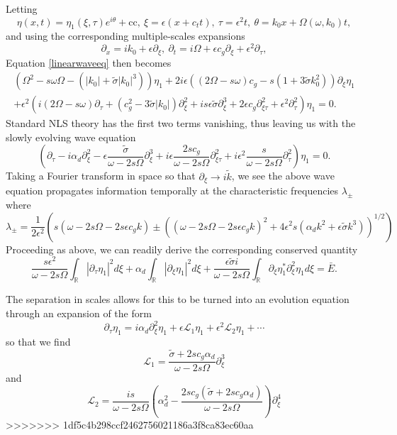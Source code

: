 \documentclass[a4paper,11pt]{article}
\newcommand{\pd}{\partial}
\begin{document}
Letting
\[
\eta(x,t) = \eta_{1}(\xi,\tau)e^{i\theta}+\mbox{cc}, ~ \xi = \epsilon(x+c_{t}t), ~ \tau = \epsilon^{2}t, ~ \theta = k_{0}x + \Omega(\omega,k_{0})t,
\]
and using the corresponding multiple-scales expansions
\[
\pd_{x} = ik_{0} + \epsilon \pd_{\xi}, ~ \pd_{t} = i\Omega + \epsilon c_{g}\pd_{\xi} + \epsilon^{2}\pd_{\tau}, 
\]
Equation \eqref{linearwaveeq} then becomes 
\begin{multline*}
\left(\Omega^{2} -s\omega\Omega - (|k_{0}|+\tilde{\sigma}|k_{0}|^{3})\right)\eta_{1} + 2i\epsilon\left((2\Omega-s\omega)c_{g} - s(1+3\tilde{\sigma}k_{0}^{2}) \right)\pd_{\xi}\eta_{1}\\
+ \epsilon^{2}\left(i(2\Omega-s\omega)\pd_{\tau}+(c^{2}_{g}-3\tilde{\sigma}|k_{0}|)\pd^{2}_{\xi} + is\epsilon\tilde{\sigma}\pd_{\xi}^{3} + 2\epsilon c_{g}\pd^{2}_{\xi \tau} + \epsilon^{2}\pd^{2}_{\tau}\right)\eta_{1} = 0.
\end{multline*}
Standard NLS theory has the first two terms vanishing, thus leaving us with the slowly evolving wave equation 
\[
\left(\pd_{\tau}-i\alpha_{d}\pd^{2}_{\xi} - \epsilon\frac{\tilde{\sigma}}{\omega-2s\Omega}\pd_{\xi}^{3} + i\epsilon \frac{2sc_{g}}{\omega-2s\Omega}\pd^{2}_{\xi \tau} + i\epsilon^{2}\frac{s}{\omega-2s\Omega}\pd^{2}_{\tau}\right)\eta_{1} = 0.
\]
Taking a Fourier transform in space so that $\pd_{\xi}\rightarrow i\tilde{k}$, we see the above wave equation propagates information temporally at the characteristic frequencies $\lambda_{\pm}$ where
\[
\lambda_{\pm} = \frac{1}{2\epsilon^{2}}\left(s(\omega-2s\Omega-2s\epsilon c_{g}k) \pm \left((\omega-2s\Omega-2s\epsilon c_{g}k)^{2} + 4\epsilon^{2}s(\alpha_{d}k^{2}+\epsilon\tilde{\sigma}k^{3}) \right)^{1/2} \right)
\]
Proceeding as above, we can readily derive the corresponding conserved quantity
\[
\frac{s\epsilon^{2}}{\omega-2s\Omega}\int_{\mathbb{R}}\left| \pd_{\tau}\eta_{1}\right|^{2}d\xi + \alpha_{d}\int_{\mathbb{R}} \left| \pd_{\xi}\eta_{1}\right|^{2}d\xi + \frac{\epsilon\tilde{\sigma}i}{\omega-2s\Omega}\int_{\mathbb{R}}\pd_{\xi}\eta^{\ast}_{1}\pd^{2}_{\xi}\eta_{1}d\xi= \bar{E}.
\]

The separation in scales allows for this to be turned into an evolution equation through an expansion of the form 
\[
\pd_{\tau}\eta_{1} = i\alpha_{d}\pd^{2}_{\xi}\eta_{1} + \epsilon \mathcal{L}_{1}\eta_{1} + \epsilon^{2}\mathcal{L}_{2}\eta_{1} + \cdots  
\]
so that we find
\[
\mathcal{L}_{1} = \frac{\tilde{\sigma}+2sc_{g}\alpha_{d}}{\omega - 2s\Omega}\pd^{3}_{\xi}
\]
and
\[
\mathcal{L}_{2} = \frac{is}{\omega-2s\Omega}\left(\alpha_{d}^{2}-\frac{2sc_{g}(\tilde{\sigma}+2sc_{g}\alpha_{d})}{\omega-2s\Omega}\right)\pd^{4}_{\xi}
\]
>>>>>>> 1df5c4b298ccf2462756021186a3f8ca83ec60aa
\end{document}
